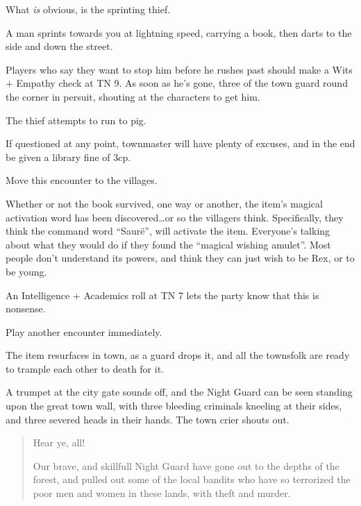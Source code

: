 \begin{multicols}{2}
What \emph{is} obvious, is the sprinting thief.

\begin{boxtext}

	A man sprints towards you at lightning speed, carrying a book, then darts to the side and down the street.

\end{boxtext}

Players who say they want to stop him before he rushes past should make a Wits + Empathy check at TN 9.  As soon as he's gone, three of the town guard round the corner in persuit, shouting at the characters to get him.

The thief attempts to run to \gls{pig}.

If questioned at any point, \gls{townmaster} will have plenty of excuses, and in the end be given a library fine of 3cp.

Move this encounter to the villages.


Whether or not the book survived, one way or another, the item's magical activation word has been discovered\ldots or so the villagers think.
Specifically, they think the command word ``Saur\"{e}'', will activate the item.
Everyone's talking about what they would do if they found the ``magical wishing amulet''.
Most people don't understand its powers, and think they can just wish to be Rex, or to be young.

An Intelligence + Academics roll at TN 7 lets the party know that this is nonsense.

Play another encounter immediately.


The item resurfaces in town, as a guard drops it, and all the townsfolk are ready to trample each other to death for it.

\begin{boxtext}

	A trumpet at the city gate sounds off, and the Night Guard can be seen standing upon the great town wall, with three bleeding criminals kneeling at their sides, and three severed heads in their hands.  The town crier shouts out.

	\begin{quotation}
		Hear ye, all!

		Our brave, and skillfull Night Guard have gone out to the depths of the forest, and pulled out some of the local bandits who have so terrorized the poor men and women in these lands, with theft and murder.


\end{quotation}
\end{boxtext}
\end{multicols}
